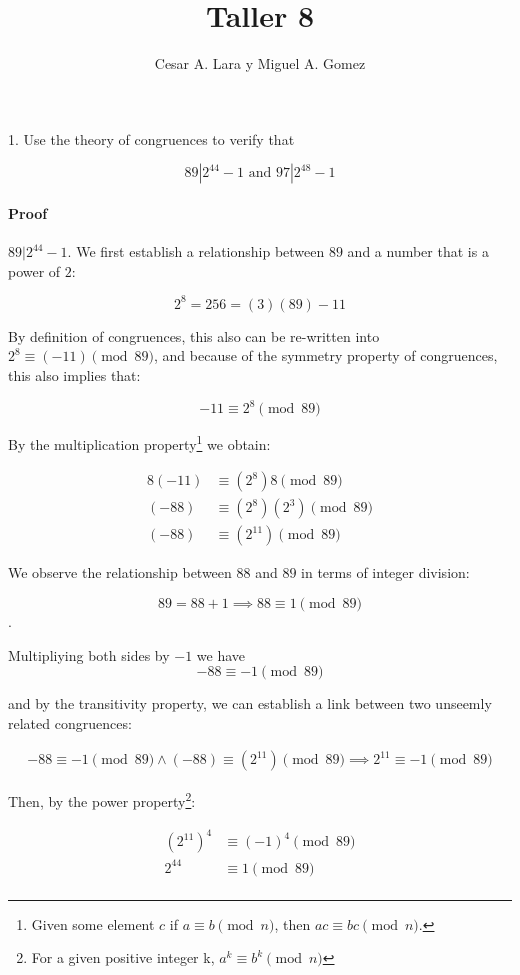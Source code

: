 \documentclass{article}
\title{Taller 8}
\author{Cesar A. Lara y Miguel A. Gomez}
\begin{document}
	\maketitle

\paragraph{}1. Use the theory of congruences to verify that

$$89|2^{44} - 1 \text{ and } 97|2^{48} - 1$$

\paragraph{Proof} $89|2^{44} - 1$. We first establish a relationship between $89$ and a number that is a power of $2$:

$$2^8 = 256 = (3)(89)-11$$

By definition of congruences, this also can be re-written into $2^{8} \equiv (-11)\pmod{ 89}$, and because of the symmetry property of congruences, this also implies that:

$$-11 \equiv {2^{8}}\pmod{89}$$

By the multiplication property\footnote{Given some element $c$ if $a \equiv b\pmod{n}$, then $ac \equiv bc \pmod{n}$.} we obtain:

\begin{align*}
	8(-11) &\equiv (2^8)8 \pmod{89}\\
	(-88) &\equiv (2^{8}) (2^{3}) \pmod{89}\\
	(-88) &\equiv (2^{11})\pmod{89}
\end{align*}

We observe the relationship between $88$ and $89$ in terms of integer division:

$$89 = 88 +1 \implies 88 \equiv 1 \pmod{89}$$.

Multipliying both sides by $-1$ we have 
$$-88 \equiv -1 \pmod{89}$$

and by the transitivity property, we can establish a link between two unseemly related congruences:

\begin{align*}
	-88 \equiv -1 \pmod{89} \land (-88) \equiv (2^{11})\pmod{89} \implies 2^{11} \equiv -1 \pmod{89}
\end{align*}

Then, by the power property\footnote{For a given positive integer k, $a^k \equiv b^k \pmod{n}$}:

\begin{align*}
	(2^{11})^{4} &\equiv (-1)^4 \pmod{89}\\
	2^{44} &\equiv 1 \pmod{89}\\
\end{align*}
\end{document}
